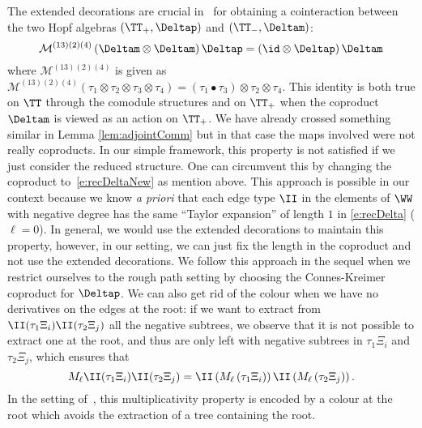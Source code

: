 \documentclass{article}
\begin{document}
 \begin{remark} \label{cointeraction} The extended decorations are crucial in~\cite{BHZ16} for obtaining a  cointeraction between the two Hopf algebras $ (\TT_+,\Deltap) $ and $ (\TT_-,\Deltam) $:
 \[
  \mathcal{M}^{(13)(2)(4)} \left( \Deltam \otimes \Deltam \right) \Deltap = \left( \id \otimes \Deltap \right) \Deltam
 \]
 where $  \mathcal{M}^{(13)(2)(4)} $ is given as $ \mathcal{M}^{(13)(2)(4)} \left( \tau_1 \otimes \tau_2 \otimes \tau_3 \otimes \tau_4 \right) = \left( \tau_1 \bullet \tau_3 \right) \otimes \tau_2 \otimes \tau_4 $. This identity is both true on $ \TT $ through the comodule structures and on $ \TT_+ $ when the coproduct $ \Deltam $ is viewed as an action on $ \TT_+ $. We have already crossed something similar in Lemma \ref{lem:adjointComm} but in that case the maps involved were not really coproducts. In our simple framework, this property is not satisfied if we just consider the reduced structure. One can circumvent this by changing the coproduct to~\eqref{e:recDeltaNew} as mention above. This approach is possible in our context because we know {\it a priori} that each edge type $ \II $ in the elements of $ \WW$ with negative degree has the same ``Taylor expansion'' of length $ 1 $ in \eqref{e:recDelta} ($ \ell = 0 $). In general, we would use the extended decorations to maintain this property, however, in our setting, we can just fix the length in the coproduct and not use the extended decorations. We follow this approach in the sequel when we restrict ourselves to the rough path setting by choosing the Connes-Kreimer coproduct for $ \Deltap $.  We can also get rid of the colour when we have no derivatives on the edges at the root: if we want to extract from $ \II(\tau_1 \Xi_i)  \II(\tau_2 \Xi_j) $ all the negative subtrees, we observe that it is not possible to extract one at the root, and thus are only left with negative subtrees in $\tau_1 \Xi_i $ and $ \tau_2 \Xi_j $, which ensures that
\[
  M_{\ell}  \II(\tau_1 \Xi_i) \II(\tau_2 \Xi_j)  = \II\left( M_{\ell} \left( \tau_1 \Xi_i\right) \right)  \II\left(   M_{\ell} \left(\tau_2 \Xi_j\right) \right).
\]
In the setting of~\cite{BHZ16}, this multiplicativity property is encoded by a colour at the root which avoids the extraction of a tree containing the root.
\end{remark}
 
\end{document}
